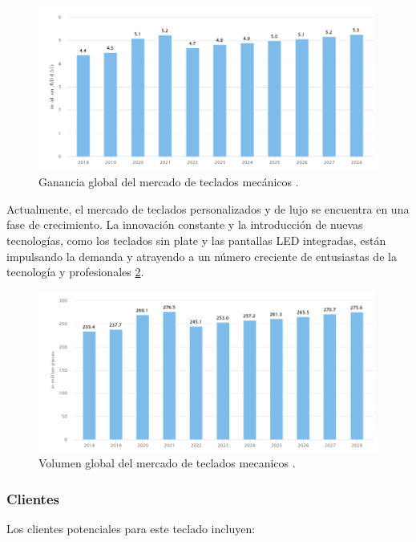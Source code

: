 \begin{figure}[H]
\centering
\includegraphics[width=1\textwidth]{imagenes/Capitulos/Cap12/RevenueKeyboardsWW.png}
\caption{Ganancia global del mercado de teclados mecánicos \cite{Comercial1}.}
\label{fig:RevenueWW}
\end{figure}

Actualmente, el mercado de teclados personalizados y de lujo se encuentra en una fase de crecimiento. La innovación constante y la introducción de nuevas tecnologías, como los teclados sin plate y las pantallas LED integradas, están impulsando la demanda y atrayendo a un número creciente de entusiastas de la tecnología y profesionales \ref{fig:VolumenWW}.

\begin{figure}[H]
\centering
\includegraphics[width=1\textwidth]{imagenes/Capitulos/Cap12/VolumenKeyboard.png}
\caption{Volumen global del mercado de teclados mecanicos \cite{Comercial1}.}
\label{fig:VolumenWW}
\end{figure}

\subsubsection{Clientes}

Los clientes potenciales para este teclado incluyen:

